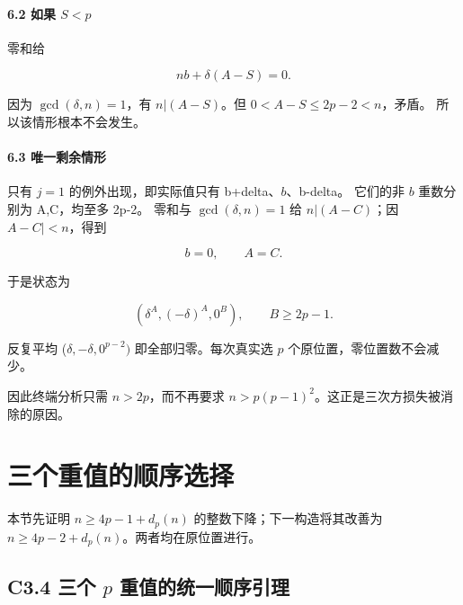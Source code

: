 \paragraph*{\texorpdfstring{{6.2} {如果} {\ensuremath{S<p}}}{6.2 如果 }}\label{C2-h11}

{零和给}

\[
nb+\delta(A-S)=0.
\]

{因为} {\ensuremath{\operatorname{gcd}(\delta ,n)=1}，有} {\ensuremath{n|(A-S)}。但} {\ensuremath{0<A-S\le 2p-2<n}，矛盾。} {所以该情形根本不会发生。}

\paragraph*{\texorpdfstring{{6.3} {唯一剩余情形}}{6.3 唯一剩余情形}}\label{C2-h12}

{只有} {\ensuremath{j=1}} {的例外出现，即实际值只有} {b+delta、\ensuremath{b}、b-delta。} {它们的非} {\ensuremath{b}} {重数分别为} {A,C，均至多} {2p-2。} {零和与} {\ensuremath{\operatorname{gcd}(\delta ,n)=1}} {给} {\ensuremath{n|(A-C)}；因} {\textbar{}\ensuremath{A-C|<n}，得到}

\[
b=0,\qquad A=C.
\]

{于是状态为}

\[
\boxed{(\delta^A,(-\delta)^A,0^B),\qquad B\ge2p-1.}
\tag{C2.7}
\]

{反复平均} {(\ensuremath{\delta ,-\delta ,0^{p-2})}} {即全部归零。每次真实选} {\ensuremath{p}} {个原位置，零位置数不会减少。}

{因此终端分析只需} {\ensuremath{n>2p}，而不再要求} {\ensuremath{n>p(p-1)^{2}}。这正是三次方损失被消除的原因。}


\section{三个重值的顺序选择}\label{construct:three-heavy}
{本节先证明} \(n\ge4p-1+d_p(n)\) {的整数下降；下一构造将其改善为} \(n\ge4p-2+d_p(n)\){。两者均在原位置进行。}

\subsection*{\texorpdfstring{{C3.4} {三个} {\ensuremath{p}} {重值的统一顺序引理}}{C3.4 三个  重值的统一顺序引理}}\label{C3-h13}

